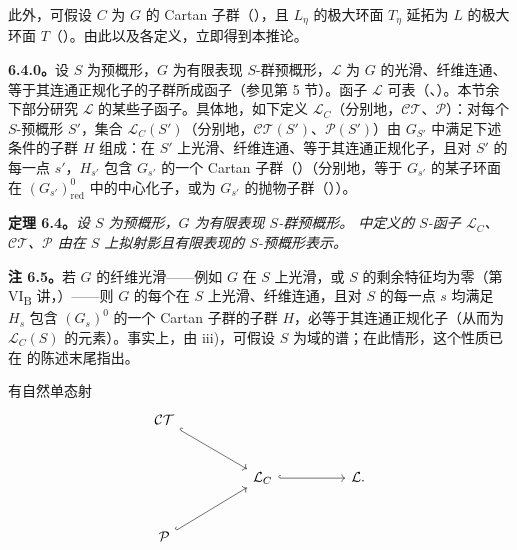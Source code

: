此外，可假设 \(C\) 为 \(G\) 的 Cartan 子群（），且 \(L_{\eta}\) 的极大环面 \(T_{\eta}\) 延拓为 \(L\) 的极大环面 \(T\)（）。由此以及各定义，立即得到本推论。

\textbf{6.4.0。}设 \(S\) 为预概形，\(G\) 为有限表现 \(S\)-群预概形，\(\mathcal{L}\) 为 \(G\) 的光滑、纤维连通、等于其连通正规化子的子群所成函子（参见第 5 节）。函子 \(\mathcal{L}\) 可表（、）。本节余下部分研究 \(\mathcal{L}\) 的某些子函子。具体地，如下定义 \(\mathcal{L}_{C}\)（分别地，\(\mathcal{CT}\)、\(\mathcal{P}\)）：对每个 \(S\)-预概形 \(S'\)，集合 \(\mathcal{L}_{C}(S')\)（分别地，\(\mathcal{CT}(S')\)、\(\mathcal{P}(S')\)）由 \(G_{S'}\) 中满足下述条件的子群 \(H\) 组成：在 \(S'\) 上光滑、纤维连通、等于其连通正规化子，且对 \(S'\) 的每一点 \(s'\)，\(H_{s'}\) 包含 \(G_{s'}\) 的一个 Cartan 子群（）（分别地，等于 \(G_{s'}\) 的某子环面在 \((G_{s'})^{0}_{\mathrm{red}}\) 中的中心化子，或为 \(G_{s'}\) 的抛物子群（））。

\textbf{定理 6.4。}\emph{设 \(S\) 为预概形，\(G\) 为有限表现 \(S\)-群预概形。 中定义的 \(S\)-函子 \(\mathcal{L}_{C}\)、\(\mathcal{CT}\)、\(\mathcal{P}\) 由在 \(S\) 上拟射影且有限表现的 \(S\)-预概形表示。}

\textbf{注 6.5。}若 \(G\) 的纤维光滑——例如 \(G\) 在 \(S\) 上光滑，或 \(S\) 的剩余特征均为零（第 VI\textsubscript{B} 讲，）——则 \(G\) 的每个在 \(S\) 上光滑、纤维连通，且对 \(S\) 的每一点 \(s\) 均满足 \(H_s\) 包含 \((G_s)^0\) 的一个 Cartan 子群的子群 \(H\)，必等于其连通正规化子（从而为 \(\mathcal{L}_{C}(S)\) 的元素）。事实上，由  iii)，可假设 \(S\) 为域的谱；在此情形，这个性质已在 的陈述末尾指出。

有自然单态射
\[
\begin{tikzcd}[column sep=huge,row sep=large]
\mathcal{CT} \arrow[dr,hook] & \\
& \mathcal{L}_{C} \arrow[r,hook] & \mathcal{L}.\\
\mathcal{P} \arrow[ur,hook] &
\end{tikzcd}
\]

